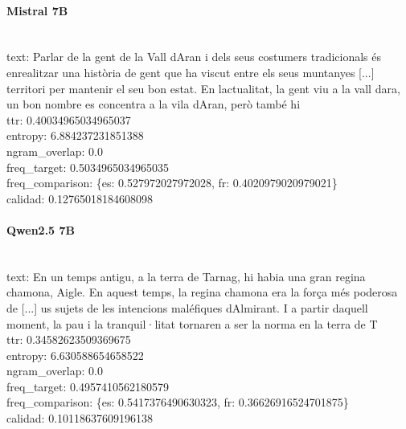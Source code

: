 \paragraph{Mistral 7B}~\\
{text:} Parlar de la gent de la Vall d\textquotesingle{}Aran i dels seus costumers tradicionals és enrealitzar una història de gent que ha viscut entre els seus muntanyes  [...]  territori per mantenir el seu bon estat. En l\textquotesingle{}actualitat, la gent viu a la vall d\textquotesingle{}ara, un bon nombre es concentra a la vila d\textquotesingle{}Aran, però també hi\\
{ttr:} 0.40034965034965037\\
{entropy:} 6.884237231851388\\
{ngram\_overlap:} 0.0\\
{freq\_target:} 0.5034965034965035\\
{freq\_comparison:} \{\textquotesingle{}es\textquotesingle{}: 0.527972027972028, \textquotesingle{}fr\textquotesingle{}: 0.4020979020979021\}\\
{calidad:} 0.12765018184608098\\

\paragraph{Qwen2.5 7B}~\\
{text:} En un temps antigu, a la terra de Tarnag, hi habia una gran regina chamona, Aigle. En aquest temps, la regina chamona era la força més poderosa de [...] us sujets de les intencions maléfiques d\textquotesingle{}Almirant. I a partir d\textquotesingle{}aquell moment, la pau i la tranquil·litat tornaren a ser la norma en la terra de T\\
{ttr:} 0.34582623509369675\\
{entropy:} 6.630588654658522\\
{ngram\_overlap:} 0.0\\
{freq\_target:} 0.4957410562180579\\
{freq\_comparison:} \{\textquotesingle{}es\textquotesingle{}: 0.5417376490630323, \textquotesingle{}fr\textquotesingle{}: 0.36626916524701875\}\\
{calidad:} 0.10118637609196138\\

